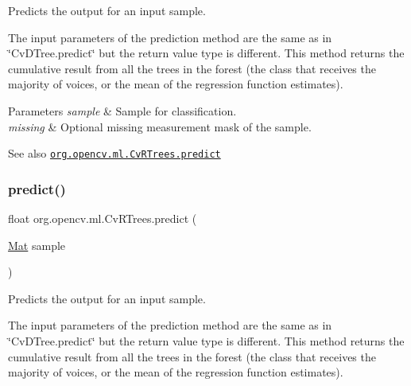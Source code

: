 Predicts the output for an input sample.

The input parameters of the prediction method are the same as in \char`\"{}\+Cv\+D\+Tree.\+predict\char`\"{} but the return value type is different. This method returns the cumulative result from all the trees in the forest (the class that receives the majority of voices, or the mean of the regression function estimates).


\begin{DoxyParams}{Parameters}
{\em sample} & Sample for classification. \\
\hline
{\em missing} & Optional missing measurement mask of the sample.\\
\hline
\end{DoxyParams}
\begin{DoxySeeAlso}{See also}
\href{http://docs.opencv.org/modules/ml/doc/random_trees.html#cvrtrees-predict}{\tt org.\+opencv.\+ml.\+Cv\+R\+Trees.\+predict} 
\end{DoxySeeAlso}
\mbox{\label{classorg_1_1opencv_1_1ml_1_1_cv_r_trees_a8d822b48ef528eaf388113c5a6f04b96}} 
\subsubsection{\texorpdfstring{predict()}{predict()}\hspace{0.1cm}{\footnotesize\ttfamily [2/2]}}
{\footnotesize\ttfamily float org.\+opencv.\+ml.\+Cv\+R\+Trees.\+predict (\begin{DoxyParamCaption}\item[{\mbox{\hyperlink{classorg_1_1opencv_1_1core_1_1_mat}{Mat}}}]{sample }\end{DoxyParamCaption})}

Predicts the output for an input sample.

The input parameters of the prediction method are the same as in \char`\"{}\+Cv\+D\+Tree.\+predict\char`\"{} but the return value type is different. This method returns the cumulative result from all the trees in the forest (the class that receives the majority of voices, or the mean of the regression function estimates).


